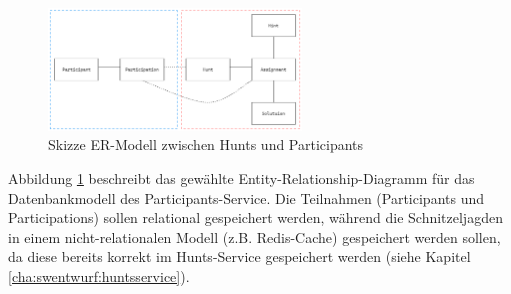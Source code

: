 \begin{figure}[H]
    \centering
    \includegraphics[width=0.6\textwidth]{images/PrAr_Software-Entwurf-Hunt-Api-Participant-Service-Er.png}
    \caption{Skizze ER-Modell zwischen Hunts und Participants}
    \label{fig:swentwurf:huntapi:participantservice:er}
\end{figure}

Abbildung \ref{fig:swentwurf:huntapi:participantservice:er} beschreibt das gewählte Entity-Relationship-Diagramm für das Datenbankmodell des Participants-Service. Die Teilnahmen (Participants und Participations) sollen relational gespeichert werden, während die Schnitzeljagden in einem nicht-relationalen Modell (z.B. Redis-Cache) gespeichert werden sollen, da diese bereits korrekt im Hunts-Service gespeichert werden (siehe Kapitel \ref{cha:swentwurf:huntsservice}).
